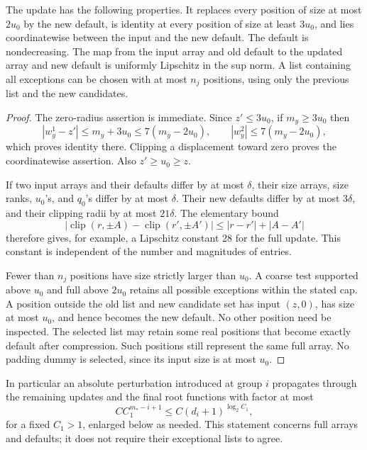 \begin{lemma}
\label{lem:buf-update}
The update has the following properties.
It replaces every position of size at most $2u_0$ by the new default, is
identity at every position of size at least $3u_0$, and lies coordinatewise
between the input and the new default.  The default is nondecreasing.
The map from the input array and old default to the updated array and new
default is uniformly Lipschitz in the sup norm.  A list containing all
exceptions can be chosen with at most $n_j$ positions, using only the
previous list and the new candidates.
\end{lemma}
\begin{proof}
The zero-radius assertion is immediate.  Since $z'\leq3u_0$, if $m_y\geq3u_0$
then
\[
 |w_y^1-z'|\leq m_y+3u_0\leq7(m_y-2u_0),
 \qquad |w_y^2|\leq7(m_y-2u_0),
\]
which proves identity there.  Clipping a displacement toward zero proves
the coordinatewise assertion.  Also $z'\geq u_0\geq z$.

If two input arrays and their defaults differ by at most $\delta$, their
size arrays, size ranks, $u_0$'s, and $q_0$'s differ by at most $\delta$.
Their new defaults differ by at most $3\delta$, and their clipping radii
by at most $21\delta$.  The elementary bound
\[
 |\operatorname{clip}(r,\pm A)-\operatorname{clip}(r',\pm A')|
       \leq |r-r'|+|A-A'|
\]
therefore gives, for example, a Lipschitz constant 28 for the full update.
This constant is independent of the number and magnitudes of entries.

Fewer than $n_j$ positions have size strictly larger than $u_0$.
A coarse test supported above $u_0$ and full above $2u_0$ retains all
possible exceptions within the stated cap.  A position outside the old
list and new candidate set has input $(z,0)$, has size at most $u_0$,
and hence becomes the new default.  No other position need be inspected.
The selected list may retain some real positions that become exactly
default after compression.  Such positions still represent the same
full array.  No padding dummy is selected, since its input size is at
most $u_0$.
\end{proof}

In particular an absolute perturbation introduced at group $i$ propagates
through the remaining updates and the final root functions with factor
at most
\begin{equation}
 C C_1^{m_*-i+1}
       \leq C(d_i+1)^{\log_2 C_1},
 \label{eq:buf-propagation}
\end{equation}
for a fixed $C_1>1$, enlarged below as needed.  This statement concerns
full arrays and defaults; it does not require their exceptional lists to
agree.

